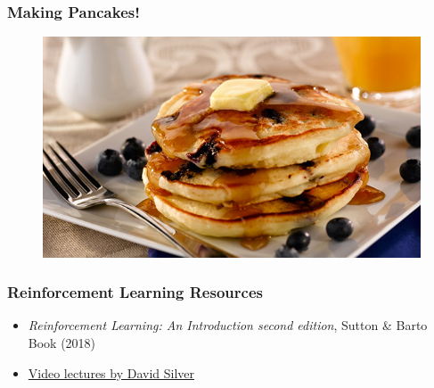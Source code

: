 \documentclass[handout]{beamer}
\begin{document}
\begin{frame}\frametitle{Making Pancakes!}\small
\begin{figure}
\href{run:videos/lecture19/pancakes.mp4}{
\includegraphics[width=0.9\linewidth]{Figures/pancakes1}\\
{}
}
\end{figure}
\end{frame}


\begin{frame}\frametitle{Reinforcement Learning Resources}\small
\begin{itemize}

\item {\it Reinforcement Learning: An Introduction second edition}, Sutton \& Barto Book (2018)
\item  \href{https://www.youtube.com/watch?v=2pWv7GOvuf0}{Video lectures by David Silver}
\end{itemize}
\end{frame}

% 
\end{document}
